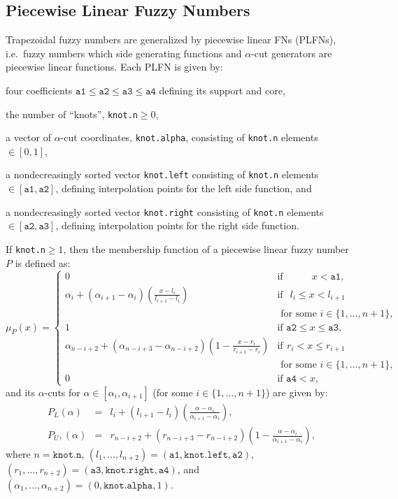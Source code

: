 \documentclass[11pt]{article}\usepackage[]{graphicx}\usepackage[]{color}
\newcommand{\hlkwc}[1]{\textcolor[rgb]{0.333,0.667,0.333}{#1}}%
\newcommand{\argument}[1]{\texttt{\hlkwc{#1}}}
\begin{document}
\subsection{Piecewise Linear Fuzzy Numbers}

Trapezoidal fuzzy numbers are generalized by piecewise linear FNs (PLFNs),
i.e.~fuzzy numbers which side generating functions and $\alpha$-cut
generators are piecewise linear functions.
Each PLFN is given by:
\begin{itemize*}
\item four coefficients $\mathtt{a1}\le\mathtt{a2}\le\mathtt{a3}\le\mathtt{a4}$
defining its support and core,
\item the number of ``knots'', \argument{knot.n}$\ge 0$,
\item a vector of $\alpha$-cut coordinates, \argument{knot.alpha}, consisting of \argument{knot.n} elements $\in[0,1]$,
\item a nondecreasingly sorted vector \argument{knot.left} consisting of \argument{knot.n} elements $\in[\mathtt{a1},\mathtt{a2}]$,
defining interpolation points for the left side function, and
\item a nondecreasingly sorted vector \argument{knot.right} consisting of \argument{knot.n} elements $\in[\mathtt{a2},\mathtt{a3}]$,
defining interpolation points for the right side function.
\end{itemize*}

If \argument{knot.n}$\ge 1$, then the membership function of
a piecewise linear fuzzy number $P$ is defined as:
\begin{equation}
\mu_P(x) = \left\{\begin{array}{ll}
0 & \text{if } \phantom{\mathtt{a2}\le\ } x<\mathtt{a1}, \\
\alpha_i+(\alpha_{i+1}-\alpha_i) \left(\frac{x-l_i}{l_{i+1}-l_i}\right)  & \text{if }\ \, l_i \le x < l_{i+1}\\
& \text{ for some } i\in\{1,\dots,n+1\}, \\
1 & \text{if } \mathtt{a2}\le x\le\mathtt{a3}, \\
\alpha_{n-i+2}+(\alpha_{n-i+3}-\alpha_{n-i+2}) \left(1-\frac{x-r_i}{r_{i+1}-r_i}\right)  & \text{if}\ \, r_i < x \le r_{i+1} \\
& \text{ for some } i\in\{1,\dots,n+1\}, \\
0 & \text{if } \mathtt{a4}<x,
\end{array}\right.
\end{equation}
and its $\alpha$-cuts for $\alpha\in[\alpha_i, \alpha_{i+1}]$
(for some $i\in\{1,\dots,n+1\}$) are given by:
\begin{eqnarray}
P_L(\alpha) & = & l_i+(l_{i+1}-l_i)\left(\frac{\alpha-\alpha_i}{\alpha_{i+1}-\alpha_i}\right), \\
P_U,(\alpha) & = & r_{n-i+2}+(r_{n-i+3}-r_{n-i+2})\left(1-\frac{\alpha-\alpha_i}{\alpha_{i+1}-\alpha_i}\right),
\end{eqnarray}
where $n=\mathtt{knot.n}$, $(l_1,\dots,l_{n+2}) = (\mathtt{a1},\mathtt{knot.left},\mathtt{a2})$,
$(r_1,\dots,r_{n+2}) = (\mathtt{a3},\mathtt{knot.right},\mathtt{a4})$,
and $(\alpha_1,\dots,\alpha_{n+2})=(0,\mathtt{knot.alpha},1)$.
\end{document}
